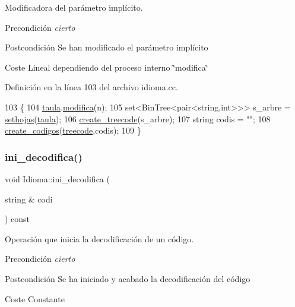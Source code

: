 Modificadora del parámetro implícito. 

\begin{DoxyPrecond}{Precondición}
{\itshape cierto} 
\end{DoxyPrecond}
\begin{DoxyPostcond}{Postcondición}
Se han modificado el parámetro implícito 
\end{DoxyPostcond}
\begin{DoxyParagraph}{Coste}
Lineal dependiendo del proceso interno \char`\"{}modifica\char`\"{} 
\end{DoxyParagraph}


Definición en la línea 103 del archivo idioma.\+cc.


\begin{DoxyCode}
103                                  \{
104   \hyperlink{class_idioma_a5e144ffaa4c1c63690e08e4e2687a13f}{taula}.\hyperlink{class_tab_freq_a78f5e7e73648d2a7ecc0bd28f4cbd4c0}{modifica}(n);
105   set<BinTree<pair<string,int>>> s\_arbre = \hyperlink{class_idioma_aa4a86dd82c04a280b32d98c775cf5eda}{sethojas}(\hyperlink{class_idioma_a5e144ffaa4c1c63690e08e4e2687a13f}{taula});
106   \hyperlink{class_idioma_aa26f926dab1f528a879244f0a1c5f3e5}{create\_treecode}(s\_arbre);
107   \textcolor{keywordtype}{string} codis = \textcolor{stringliteral}{""};
108   \hyperlink{class_idioma_a30aeaf1fc288edfcb09a00e47cad834a}{create\_codigos}(\hyperlink{class_idioma_a5eeaf73b2498503c5c686ac259e1f675}{treecode},codis);
109 \}
\end{DoxyCode}
\mbox{\label{class_idioma_a797cfc4dd3d423c41f46926a68410992}} 
\subsubsection{\texorpdfstring{ini\+\_\+decodifica()}{ini\_decodifica()}}
{\footnotesize\ttfamily void Idioma\+::ini\+\_\+decodifica (\begin{DoxyParamCaption}\item[{string \&}]{codi }\end{DoxyParamCaption}) const}



Operación que inicia la decodificación de un código. 

\begin{DoxyPrecond}{Precondición}
{\itshape cierto} 
\end{DoxyPrecond}
\begin{DoxyPostcond}{Postcondición}
Se ha iniciado y acabado la decodificación del código 
\end{DoxyPostcond}
\begin{DoxyParagraph}{Coste}
Constante 
\end{DoxyParagraph}


